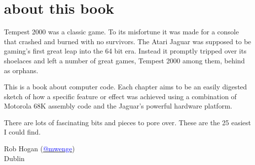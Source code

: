 \chapter*{about this book} 
Tempest 2000 was a classic game. To its misfortune it was made for a console that crashed and burned with no
survivors. The Atari Jaguar was supposed to be gaming's first great leap into the 64 bit era. Instead it 
promptly tripped over its shoelaces and left a number of great games, Tempest 2000 among them, behind
as orphans.

This is a book about computer code. Each chapter aims to be an easily digested sketch of how
a specific feature or effect was achieved using a combination of Motorola 68K assembly code and
the Jaguar's powerful hardware platform.

There are lots of fascinating bits and pieces to pore over. These are the 25 easiest I could find.


Rob Hogan (\href{https://mastodon.social/@mwenge}{\textcolor{blue}{@mwenge}})\\
Dublin \the\year{} \\

